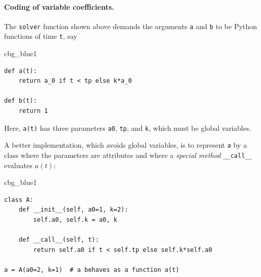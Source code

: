 \documentclass[%
oneside,                 %
final,                   %
10pt]{article}
\newenvironment{_cod_tight}[1]{
   \def\FrameCommand{\colorbox{#1}}
   \FrameRule0.6pt\MakeFramed {\FrameRestore}\vskip3mm}
   {\vskip0mm\endMakeFramed}
\newenvironment{cod}[1]{
\bgroup\rmfamily
\fboxsep=0mm\relax
\begin{_cod_tight}{#1}
\list{}{\parsep=-2mm\parskip=0mm\topsep=0pt\leftmargin=2mm
\rightmargin=2\leftmargin\leftmargin=4pt\relax}
\item\relax}
{\endlist\end{_cod_tight}\egroup}
\begin{document}
\paragraph{Coding of variable coefficients.}
The \texttt{solver} function shown above demands the arguments \texttt{a} and \texttt{b} to
be Python functions of time \texttt{t}, say

\begin{cod}{cbg_blue1}\begin{Verbatim}[numbers=none,fontsize=\fontsize{9pt}{9pt},baselinestretch=0.95,xleftmargin=2mm]
def a(t):
    return a_0 if t < tp else k*a_0

def b(t):
    return 1
\end{Verbatim}
\end{cod}
\noindent
Here, \texttt{a(t)} has three parameters \texttt{a0}, \texttt{tp}, and \texttt{k},
which must be global variables.

A better implementation, which avoids global variables,
is to represent \texttt{a} by a class where the
parameters are attributes and where a \emph{special method} \Verb!__call__!
evaluates $a(t)$:

\begin{cod}{cbg_blue1}\begin{Verbatim}[numbers=none,fontsize=\fontsize{9pt}{9pt},baselinestretch=0.95,xleftmargin=2mm]
class A:
    def __init__(self, a0=1, k=2):
        self.a0, self.k = a0, k

    def __call__(self, t):
        return self.a0 if t < self.tp else self.k*self.a0

a = A(a0=2, k=1)  # a behaves as a function a(t)
\end{Verbatim}
\end{cod}
\noindent

\end{document}
